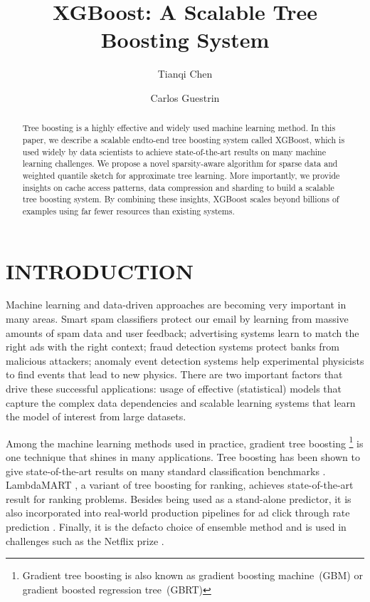 \documentclass[sigconf]{acmart}
\title{XGBoost: A Scalable Tree Boosting System}
\author{Tianqi Chen}
\affiliation{
  \institution{University of Washington}
  \country{} %
}
\author{Carlos Guestrin}
\affiliation{
  \institution{University of Washington}
  \country{}
}
\begin{document}
\begin{abstract} %
Tree boosting is a highly effective and widely used machine
learning method. In this paper, we describe a scalable endto-end tree boosting system called XGBoost, which is used
widely by data scientists to achieve state-of-the-art results on many machine learning challenges. We propose a novel
sparsity-aware algorithm for sparse data and weighted quantile sketch for approximate tree learning. More importantly, 
we provide insights on cache access patterns, data compression and sharding to build a scalable tree boosting system.
By combining these insights, XGBoost scales beyond billions of examples using far fewer resources than existing systems.
\end{abstract}



\maketitle

\section{INTRODUCTION}
\label{sec:INTRODUCTION}
Machine learning and data-driven approaches are becoming very important in many areas. Smart spam classifiers
protect our email by learning from massive amounts of spam data and user feedback; advertising systems learn to
match the right ads with the right context; fraud detection systems protect banks from malicious attackers; anomaly
event detection systems help experimental physicists to find events that lead to new physics. There are two 
important factors that drive these successful applications: usage of effective (statistical) models that capture 
the complex data dependencies and scalable learning systems that learn the model of interest from large datasets.

Among the machine learning methods used in practice, gradient tree boosting \cite{friedman2001greedy}
\footnote{Gradient tree boosting is also known as gradient boosting machine~(GBM) or gradient boosted regression tree~(GBRT)} 
is one technique that shines
in many applications. Tree boosting has been shown to give state-of-the-art results on many standard classification
benchmarks \cite{li3491robust}. LambdaMART \cite{burges2010ranknet}, a variant of tree boosting for ranking, achieves state-of-the-art result for ranking 
problems. Besides being used as a stand-alone predictor, it is also incorporated into real-world production pipelines for
ad click through rate prediction \cite{he2014practical}. Finally, it is the defacto choice of ensemble method and is used in challenges
such as the Netflix prize \cite{bennett2007kdd}.
\end{document}
